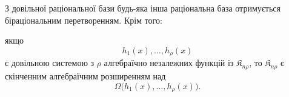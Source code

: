 \documentclass[11pt]{article}
\providecommand{\Kfield}{\mathfrak{K}}
\begin{document}
З довільної раціональної бази будь-яка інша раціональна база отримується біраціональним перетворенням. Крім того:

якщо
\[
  h_1(x),\ldots,h_\rho(x)
\]
є довільною системою з $\rho$ алгебраїчно незалежних функцій із $\Kfield_{n\rho}$, то $\Kfield_{n\rho}$ є скінченним алгебраїчним розширенням над
\[
  \Omega\bigl(h_1(x),\ldots,h_\rho(x)\bigr).
\]
\end{document}
